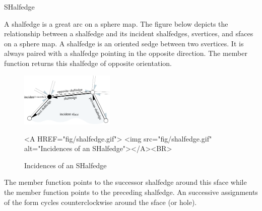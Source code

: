 
\ccRefPageBegin



\begin{ccRefClass}{SHalfedge}

\ccDefinition

A shalfedge is a great arc on a sphere map. 
The figure below
depicts the relationship between a shalfedge and its incident
shalfedges, svertices, and sfaces on a sphere map.  A shalfedge is 
an oriented sedge between two svertices. It is always paired with a 
shalfedge pointing in
the opposite direction. The  member function returns
this shalfedge of opposite orientation.

\begin{figure}[bht]
\begin{center}
\begin{ccTexOnly}
          \parbox{0.4\textwidth}{%
              \includegraphics[width=0.4\textwidth]{Nef_S2_ref/fig/shalfedge}%
          }
\end{ccTexOnly}
\begin{ccHtmlOnly}
    <A HREF="fig/shalfedge.gif">
        <img src="fig/shalfedge.gif" 
             alt="Incidences of an SHalfedge"></A><BR>
\end{ccHtmlOnly}
\caption{Incidences of an SHalfedge}
\label{figureNefS2SVertexIncidences}
\end{center}
\end{figure}

The  member function points 
to the successor shalfedge around this sface while the  member 
function points to the preceding shalfedge.  An
successive assignments of the form  cycles
counterclockwise around the sface (or hole).


\end{ccRefClass}
